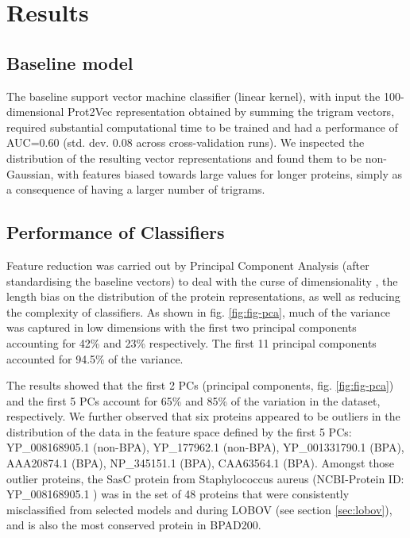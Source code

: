 \documentclass[10pt,journal,compsoc,twoside]{IEEEtran}
\begin{document}
\section{Results}
\label{sec:Results}

\subsection{Baseline model}
\label{sec:baseline}
The baseline support vector machine classifier (linear kernel), with input the 100-dimensional Prot2Vec representation obtained by summing the trigram vectors, required substantial computational time to be trained and had a performance of AUC=0.60 (std. dev. 0.08 across cross-validation runs). We inspected the distribution of the resulting vector representations and found them to be non-Gaussian, with features biased towards large values for longer proteins, simply as a consequence of having a larger number of trigrams.


\subsection{Performance of Classifiers}
\label{sec:pca-hc}

Feature reduction was carried out by Principal Component Analysis (after standardising the baseline vectors)  to deal with the curse of dimensionality \cite{dynamic_programming}, the length bias on the distribution of the protein representations, as well as reducing the complexity of classifiers. As shown in fig. \ref{fig:fig-pca}, much of the variance was captured in low dimensions with the first two principal components accounting for 42\% and 23\% respectively. The first 11 principal components accounted for 94.5\% of the variance. 

The results showed that the first 2 PCs (principal components, fig. \ref{fig:fig-pca}) and the first 5 PCs account for 65\% and 85\% of the variation in the dataset, respectively. We further observed that six proteins appeared to be outliers in the distribution of the data in the feature space defined by the first 5 PCs: YP\_008168905.1 (non-BPA), YP\_177962.1 (non-BPA), YP\_001331790.1 (BPA), AAA20874.1 (BPA), NP\_345151.1 (BPA), CAA63564.1 (BPA). Amongst those outlier proteins, the SasC protein from Staphylococcus aureus (NCBI-Protein ID: YP\_008168905.1 \cite{YP_008168905.1}) was in the set of 48 proteins that were consistently misclassified from selected models and during LOBOV (see section  \ref{sec:lobov}), and is also the most conserved protein in BPAD200.
\end{document}

